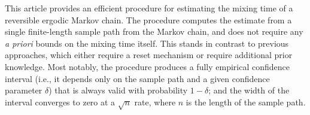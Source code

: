 This article provides an efficient procedure for estimating the mixing
time of a reversible ergodic Markov chain.
The procedure computes the estimate from a single finite-length sample
path from the Markov chain, and does not require any \emph{a priori}
bounds on the mixing time itself.
This stands in contrast to previous approaches, which either require a
reset mechanism or require additional prior knowledge.
Most notably, the procedure produces a fully empirical confidence
interval (i.e., it depends only on the sample path and a given
confidence parameter $\delta$) that is always valid with probability
$1-\delta$; and the width of the interval converges to zero at a
$\sqrt{n}$ rate, where $n$ is the length of the sample path.

%
%
